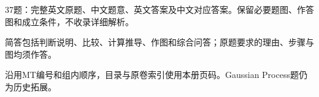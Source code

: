 
37题：完整英文原题、中文题意、英文答案及中文对应答案。保留必要题图、作答图和成立条件，不收录详细解析。


简答包括判断说明、比较、计算推导、作图和综合问答；原题要求的理由、步骤与图均须作答。


沿用MT编号和组内顺序，目录与原卷索引使用本册页码。Gaussian Process题仍为历史拓展。
